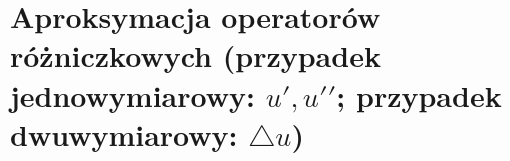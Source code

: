 \section{Aproksymacja operatorów różniczkowych (przypadek jednowymiarowy: ${u}', {{u}'}'$; przypadek dwuwymiarowy: $\bigtriangleup u$)}